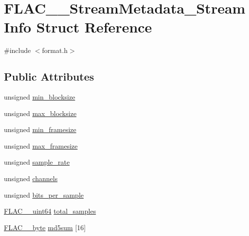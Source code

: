 \hypertarget{struct_f_l_a_c_____stream_metadata___stream_info}{}\section{F\+L\+A\+C\+\_\+\+\_\+\+Stream\+Metadata\+\_\+\+Stream\+Info Struct Reference}
\label{struct_f_l_a_c_____stream_metadata___stream_info}


{\ttfamily \#include $<$format.\+h$>$}

\subsection*{Public Attributes}
\begin{DoxyCompactItemize}
\item 
unsigned \mbox{\hyperlink{struct_f_l_a_c_____stream_metadata___stream_info_ad999bb6f695206464df8d76126812572}{min\+\_\+blocksize}}
\item 
unsigned \mbox{\hyperlink{struct_f_l_a_c_____stream_metadata___stream_info_a0eda0a30574e0b51716f34c6a90912dc}{max\+\_\+blocksize}}
\item 
unsigned \mbox{\hyperlink{struct_f_l_a_c_____stream_metadata___stream_info_a4f9408c082ef8bb4f14a8da6e8e24fd4}{min\+\_\+framesize}}
\item 
unsigned \mbox{\hyperlink{struct_f_l_a_c_____stream_metadata___stream_info_a89e04506e5030310582fed83b9a36022}{max\+\_\+framesize}}
\item 
unsigned \mbox{\hyperlink{struct_f_l_a_c_____stream_metadata___stream_info_a127c95ed9ea6564191f57a1642e27c97}{sample\+\_\+rate}}
\item 
unsigned \mbox{\hyperlink{struct_f_l_a_c_____stream_metadata___stream_info_a13bf6f8e5bdaa2dff48c29c7aff4ef88}{channels}}
\item 
unsigned \mbox{\hyperlink{struct_f_l_a_c_____stream_metadata___stream_info_af8886c928641f6dcc242652adf4e1bc9}{bits\+\_\+per\+\_\+sample}}
\item 
\mbox{\hyperlink{ordinals_8h_aa78c8c70a3eb8a58af7436f278acde8e}{F\+L\+A\+C\+\_\+\+\_\+uint64}} \mbox{\hyperlink{struct_f_l_a_c_____stream_metadata___stream_info_a23d6f6769cb9bbf052a3a4f592f2e383}{total\+\_\+samples}}
\item 
\mbox{\hyperlink{ordinals_8h_a5eb569b12d5b047cdacada4d57924ee3}{F\+L\+A\+C\+\_\+\+\_\+byte}} \mbox{\hyperlink{struct_f_l_a_c_____stream_metadata___stream_info_ac9cd72dc89ed697f78e8521fb69d232f}{md5sum}} \mbox{[}16\mbox{]}
\end{DoxyCompactItemize}


